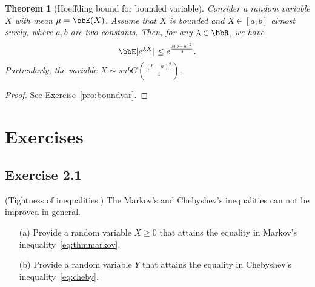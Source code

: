 \documentclass[11pt]{article}
\theoremstyle{plain}
\newtheorem{thm}{Theorem}[section]
\theoremstyle{definition}
\begin{document}
\begin{thm}[Hoeffding bound for bounded variable]\label{thm:boundvar}
Consider a random variable $X$ with mean $\mu = \bbE(X)$. Assume that $X$ is bounded and $X \in [a,b]$ almost surely, where $a, b$ are two constants. Then, for any $\lambda \in \bbR$, we have
\begin{equation}
	\bbE[e^{\lambda X}] \leq e^{\frac{s(b-a)^2}{8}}.
\end{equation}
Particularly, the variable $X \sim subG(\frac{(b-a)^2}{4})$.
\end{thm}

\begin{proof}
	See Exercise~\ref{pro:boundvar}.
\end{proof}


\section{Exercises}

\subsection{Exercise 2.1} (Tightness of inequalities.) The Markov's and Chebyshev's inequalities can not be improved in general. 
\begin{enumerate}
	\item[(a)] Provide a random variable $X \geq 0$ that attains the equality in Markov's inequality~\eqref{eq:thmmarkov}.  
	\item[(b)] Provide a random variable $Y$ that attains the equality in Chebyshev's inequality~\eqref{eq:cheby}.  
\end{enumerate}
\end{document}
